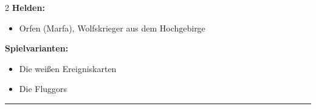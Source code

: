 \documentclass[10pt, a4paper, oneside]{book}
\begin{document}
\begin{multicols}{2}
\textbf{Helden:} 

\begin{itemize}[topsep=0pt,itemsep=-1ex,partopsep=1ex,parsep=1ex]
    \item Orfen (Marfa), Wolfskrieger aus dem Hochgebirge\bigskip
\end{itemize}

\textbf{Spielvarianten:} 

\begin{itemize}[topsep=0pt,itemsep=-1ex,partopsep=1ex,parsep=1ex]
    \item Die weißen Ereigniskarten
    \item Die Fluggors
\end{itemize}


\vspace*{5em}

\end{multicols}

\hrule
\end{document}
